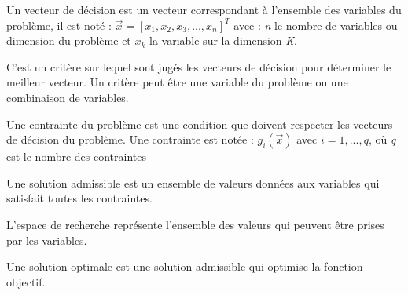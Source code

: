 \begin{definition}
	Un vecteur de décision est un vecteur correspondant à l'ensemble des variables du problème, il est noté : $\vec{x} = [x_1,x_2,x_3,...,x_n]^T$ avec : \emph{n} le nombre de variables ou dimension du problème et $x_k$ la variable sur la dimension \emph{K}.
\end{definition}

\begin{definition}
	C'est un critère sur lequel sont jugés les vecteurs de décision pour déterminer le meilleur vecteur. Un critère peut être une variable du problème ou une combinaison de variables.
\end{definition}

\begin{definition}[Contraintes]
	Une contrainte du problème est une condition que doivent respecter les vecteurs de décision du problème. Une contrainte est notée : $g_i (\vec{x})$ avec $i=1,..., q$, o\`{u} \emph{q} est le nombre des contraintes
\end{definition}

\begin{definition}
	Une solution admissible est un ensemble de valeurs données aux variables qui satisfait toutes les contraintes.
\end{definition}

\begin{definition}
	L'espace de recherche représente l'ensemble des valeurs qui peuvent être prises par les variables.
\end{definition}

\begin{definition}
	Une solution optimale est une solution admissible qui optimise la fonction objectif.
\end{definition}

